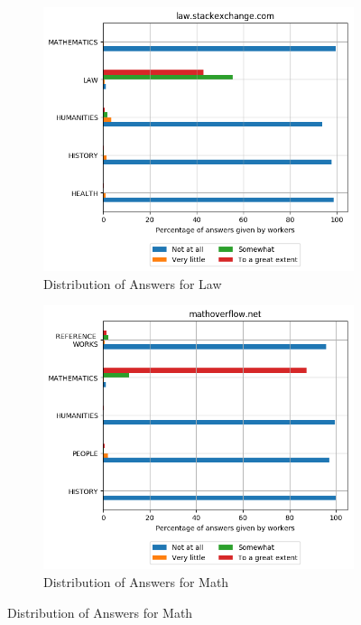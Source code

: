  \begin{figure}[H]
 \ContinuedFloat
    \centering
    \begin{subfigure}{0.5\textwidth}
    \centering
        \includegraphics[width=1\linewidth]{imgs/crowd-results/law_stackexchange_com}
        \caption{Distribution of Answers for Law}
        \label{fig:crowd-results-law}
    \end{subfigure}%
    \begin{subfigure}{0.5\textwidth}
    \centering
        \includegraphics[width=1\linewidth]{imgs/crowd-results/mathoverflow_net}
        \caption{Distribution of Answers for Math}
        \label{fig:crowd-results-math}
    \end{subfigure}
 

\end{figure}
